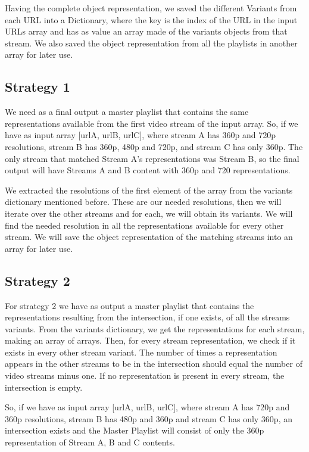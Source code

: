 Having the complete object representation, we saved the different Variants from each URL into a Dictionary, where the key is the index of the URL in the input URLs array and has as value an array made of the variants objects from that stream. We also saved the object representation from all the playlists in another array for later use.

\subsection{Strategy 1}

We need as a final output a master playlist that contains the same representations available from the first video stream of the input array. So, if we have as input array [urlA, urlB, urlC], where stream A has 360p  and 720p resolutions, stream B has 360p, 480p and 720p, and stream C has only 360p. The only stream that matched Stream A's representations was Stream B, so the final output will have Streams A and B content with 360p and 720 representations. 

We extracted the resolutions of the first element of the array from the variants dictionary mentioned before. These are our needed resolutions, then we will iterate over the other streams and for each, we will obtain its variants. We will find the needed resolution in all the representations available for every other stream. We will save the object representation of the matching streams into an array for later use.

\subsection{Strategy 2}

For strategy 2 we have as output a master playlist that contains the representations resulting from the intersection, if one exists, of all the streams variants. From the variants dictionary, we get the representations for each stream, making an array of arrays. Then, for every stream representation, we check if it exists in every other stream variant. The number of times a representation appears in the other streams to be in the intersection should equal the number of video streams minus one. If no representation is present in every stream, the intersection is empty.

So, if we have as input array [urlA, urlB, urlC], where stream A has 720p and 360p resolutions, stream B has 480p and 360p and stream C has only 360p, an intersection exists and the Master Playlist will consist of only the 360p representation of Stream A, B and C contents.


